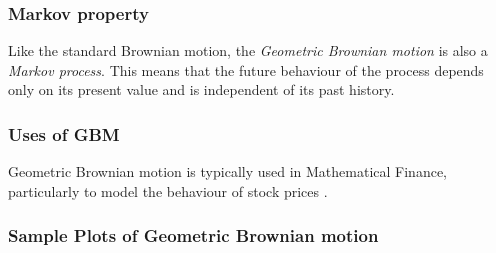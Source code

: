 \subsubsection{Markov property}
Like the standard Brownian motion, the \textit{Geometric Brownian motion} is also a \textit{Markov process}. This means that the future behaviour of the process depends only on its present value and is independent of its past history.

\subsubsection{Uses of GBM}
Geometric Brownian motion is typically used in Mathematical Finance, particularly to model the behaviour of stock prices \cite{hull_2021_options}.

\subsubsection{Sample Plots of Geometric Brownian motion}
